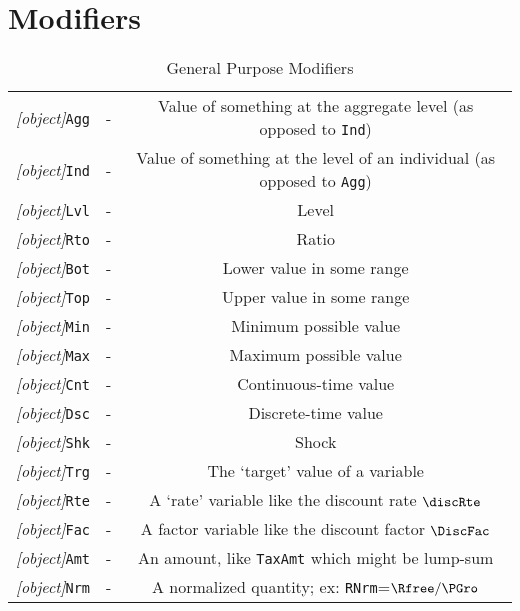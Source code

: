 \documentclass[12pt]{econtex}
\begin{document}
\section{Modifiers}
\begin{table}[ht]
	\centering
	\begin{tabular}{|>{\ttfamily}ccc|} 		
		\hline
   \textit{[object]}\texttt{Agg} & - & Value of something at the aggregate level (as opposed to \texttt{Ind})
\\ \textit{[object]}\texttt{Ind} & - & Value of something at the level of an individual (as opposed to \texttt{Agg})
\\ \textit{[object]}\texttt{Lvl} & - & Level 
\\ \textit{[object]}\texttt{Rto} & - & Ratio 
\\ \textit{[object]}\texttt{Bot} & - & Lower value in some range 
\\ \textit{[object]}\texttt{Top} & - & Upper value in some range 
\\ \textit{[object]}\texttt{Min} & - & Minimum possible value 
\\ \textit{[object]}\texttt{Max} & - & Maximum possible value 
\\ \textit{[object]}\texttt{Cnt} & - & Continuous-time value
\\ \textit{[object]}\texttt{Dsc} & - & Discrete-time value
\\ \textit{[object]}\texttt{Shk} & - & Shock 
\\ \textit{[object]}\texttt{Trg} & - & The `target' value of a variable 
\\ \textit{[object]}\texttt{Rte} & - & A `rate' variable like the discount rate $\discRte$
\\ \textit{[object]}\texttt{Fac} & - & A factor variable like the discount factor $\DiscFac$
\\ \textit{[object]}\texttt{Amt} & - & An amount, like \texttt{TaxAmt} which might be lump-sum
\\ \textit{[object]}\texttt{Nrm} & - & A normalized quantity; ex: \texttt{RNrm}=$\Rfree/\PGro$
\\ 	\hline
	\end{tabular}
	\caption{General Purpose Modifiers}
	\label{table:General}
\end{table}	
\end{document}
